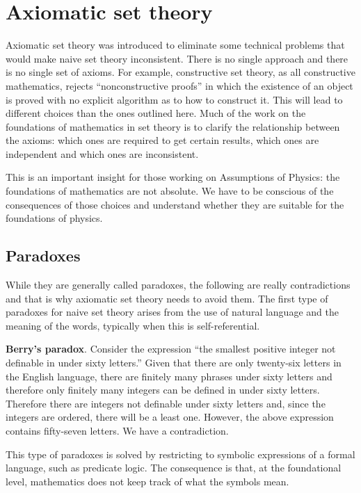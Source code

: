 \documentclass{article}
\begin{document}
\section{Axiomatic set theory}

Axiomatic set theory was introduced to eliminate some technical problems that would make naive set theory inconsistent. There is no single approach and there is no single set of axioms. For example, constructive set theory, as all constructive mathematics, rejects ``nonconstructive proofs'' in which the existence of an object is proved with no explicit algorithm as to how to construct it. This will lead to different choices than the ones outlined here. Much of the work on the foundations of mathematics in set theory is to clarify the relationship between the axioms: which ones are required to get certain results, which ones are independent and which ones are inconsistent.

This is an important insight for those working on Assumptions of Physics: the foundations of mathematics are not absolute. We have to be conscious of the consequences of those choices and understand whether they are suitable for the foundations of physics.

\subsection{Paradoxes}

While they are generally called paradoxes, the following are really contradictions and that is why axiomatic set theory needs to avoid them. The first type of paradoxes for naive set theory arises from the use of natural language and the meaning of the words, typically when this is self-referential.

\textbf{Berry's paradox}. Consider the expression ``the smallest positive integer not definable in under sixty letters.'' Given that there are only twenty-six letters in the English language, there are finitely many phrases under sixty letters and therefore only finitely many integers can be defined in under sixty letters. Therefore there are integers not definable under sixty letters and, since the integers are ordered, there will be a least one. However, the above expression contains fifty-seven letters. We have a contradiction.

This type of paradoxes is solved by restricting to symbolic expressions of a formal language, such as predicate logic. The consequence is that, at the foundational level, mathematics does not keep track of what the symbols mean.
\end{document}
